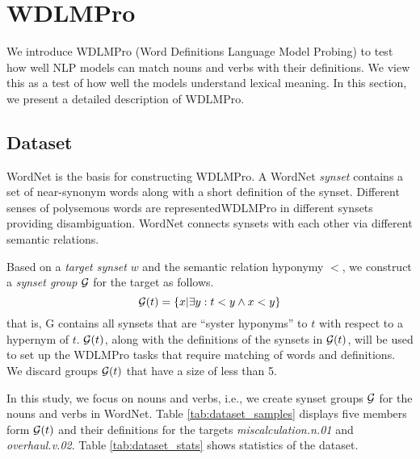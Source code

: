 \documentclass[11pt,a4paper]{article}
\begin{document}
\section{WDLMPro}
We introduce  WDLMPro (Word Definitions Language Model
Probing) to test how well NLP models can match
nouns and verbs with  their
definitions.
We view this as a test of how well the models understand lexical meaning.
In this section, we
present a detailed description of WDLMPro.

\subsection{Dataset}
WordNet \cite{miller95wordnet} is the basis for
constructing WDLMPro.  A WordNet \textit{synset} contains a
set of near-synonym words along with a short definition of
the synset.  Different senses of polysemous words are
representedWDLMPro in different synsets providing
disambiguation. WordNet connects synsets with each other via
different semantic relations.

Based on a \emph{target synset}
$w$ and the semantic relation hyponymy $<$, we construct
a \emph{synset group} $\cal G$ for the target as follows.
\[
  {\cal G}(t) = \{ x | \exists y: t<y \wedge x<y \}
  \]
that is, {\cal G} contains all synsets that are ``syster
hyponyms'' to $t$ with respect to a hypernym of $t$.
${\cal G}(t)$, along with the definitions of the synsets in
${\cal G}(t)$,
will be used to
set up the WDLMPro tasks that require matching of words and definitions.
We discard groups ${\cal G}(t)$ that
have a size of less than 5.


In this study, we focus on nouns and verbs, i.e., we create
synset groups ${\cal G}$ for the nouns and verbs in WordNet.
Table
\ref{tab:dataset_samples} displays five members form ${\cal
  G} (t)$ 
and their definitions
for the targets
\emph{miscalculation.n.01} and
\emph{overhaul.v.02}. 
Table \ref{tab:dataset_stats} shows statistics of the dataset.




  
\end{document}
